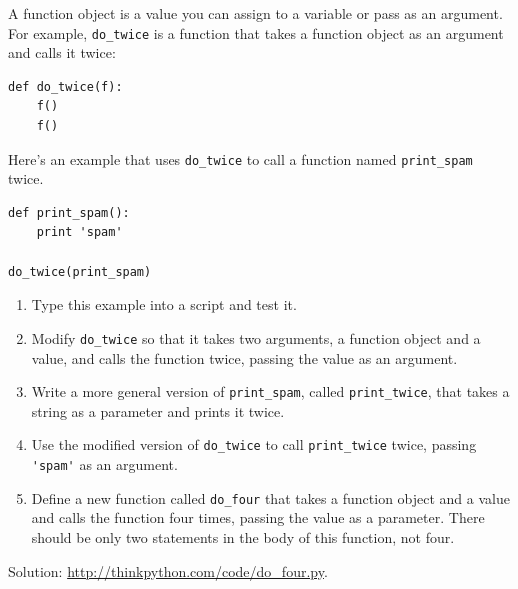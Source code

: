 \documentclass[10pt]{book}
\begin{document}
\begin{CJK}{UTF8}{gbsn}
\begin{exercise}
\end{exercise}


\begin{exercise}

A function object is a value you can assign to a variable
or pass as an argument.  For example, \verb"do_twice" is a function
that takes a function object as an argument and calls it twice:

\begin{verbatim}
def do_twice(f):
    f()
    f()
\end{verbatim}

Here's an example that uses \verb"do_twice" to call a function
named \verb"print_spam" twice.

\begin{verbatim}
def print_spam():
    print 'spam'

do_twice(print_spam)
\end{verbatim}

\begin{enumerate}

\item Type this example into a script and test it.

\item Modify \verb"do_twice" so that it takes two arguments, a
function object and a value, and calls the function twice,
passing the value as an argument.

\item Write a more general version of \verb"print_spam", called
\verb"print_twice", that takes a string as a parameter and prints
it twice.

\item Use the modified version of \verb"do_twice" to call
\verb"print_twice" twice, passing \verb"'spam'" as an argument.

\item Define a new function called 
\verb"do_four" that takes a function object and a value
and calls the function four times, passing the value
as a parameter.  There should be only
two statements in the body of this function, not four.

\end{enumerate}

Solution: \url{http://thinkpython.com/code/do_four.py}.

\end{exercise}



\begin{exercise}


\end{exercise}
\end{CJK}
\end{document}
